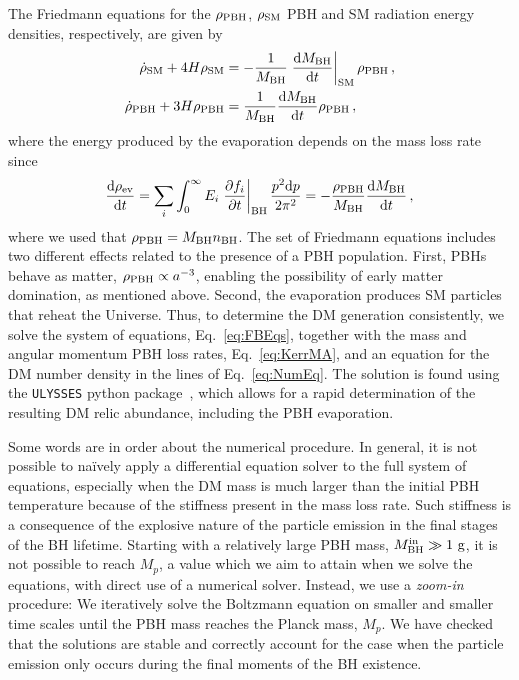 \documentclass[aps,prd,reprint,twocolumn,preprintnumbers,floatfix,nofootinbib]{revtex4-1}
\newcommand{\MBH}{M_{\rm BH}}
\newcommand{\MPL}{M_p}
\newcommand{\bh}{{\rm BH}}
\begin{document}
The Friedmann equations for the $\rho_{\rm PBH}$, $\rho_{\rm SM}$ PBH and SM radiation energy densities, respectively, are given by
\begin{subequations}\label{eq:FBEqs}
\begin{align}
    \dot{\rho}_{\rm SM} + 4H \rho_{\rm SM} &= -\frac{1}{\MBH}\left.\frac{\dd \MBH}{\dd t}\right|_{\rm SM}\rho_{\rm PBH}\,,\\
    \dot{\rho}_{\rm PBH} + 3H \rho_{\rm PBH} &= \frac{1}{\MBH}\frac{\dd \MBH}{\dd t}\rho_{\rm PBH}\,,
\end{align}
\end{subequations}
where the energy produced by the evaporation depends on the mass loss rate since
\begin{align}
\frac{\dd \rho_{\rm ev}}{\dd t}=\sum_i \int_0^\infty E_i \left.\frac{\partial f_i}{\partial t}\right|_\bh\frac{p^2\dd p}{2\pi^2}=-\frac{\rho_{\rm PBH}}{\MBH} \frac{\dd \MBH}{\dd t}\,,
\end{align}
where we used that $\rho_{\rm PBH}=\MBH n_\bh$. The set of Friedmann equations includes two different effects related to the presence of a PBH population. First, PBHs behave as matter, $\rho_{\rm PBH}\propto a^{-3}$, enabling the possibility of early matter domination, as mentioned above. Second, the evaporation produces SM particles that reheat the Universe. Thus, to determine the DM generation consistently, we solve the system of equations, Eq.~\eqref{eq:FBEqs}, together with the mass and angular momentum PBH loss rates, Eq.~\eqref{eq:KerrMA}, and an equation for the DM number density in the lines of Eq.~\eqref{eq:NumEq}. The solution is found using the {\tt ULYSSES} python package~\cite{Granelli:2020pim}, which allows for a rapid determination of the resulting DM relic abundance, including the PBH evaporation. 

Some words are in order about the numerical procedure. In general, it is not possible to na\"ively apply a differential equation solver to the full system of equations, especially when the DM mass is much larger than the initial PBH temperature because of the stiffness present in the mass loss rate. Such stiffness is a consequence of the explosive nature of the particle emission in the final stages of the BH lifetime. Starting with a relatively large PBH mass, $\MBH^{\rm in} \gg 1~{\rm g}$, it is not possible to reach $\MPL$, a value which we aim to attain when we solve the equations, with direct use of a numerical solver. Instead, we use a \emph{zoom-in} procedure: We iteratively solve the Boltzmann equation on smaller and smaller time scales until the PBH mass reaches the Planck mass, $M_p$. We have checked that the solutions are stable and correctly account for the case when the particle emission only occurs during the final moments of the BH existence. 
\end{document}
